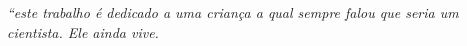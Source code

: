 \begin{epigrafe}
	\vspace*{\fill}
	\begin{flushright}
		\textit{``este trabalho é dedicado a uma criança a qual sempre falou que seria um cientista. Ele ainda vive.}
	\end{flushright}
\end{epigrafe}
